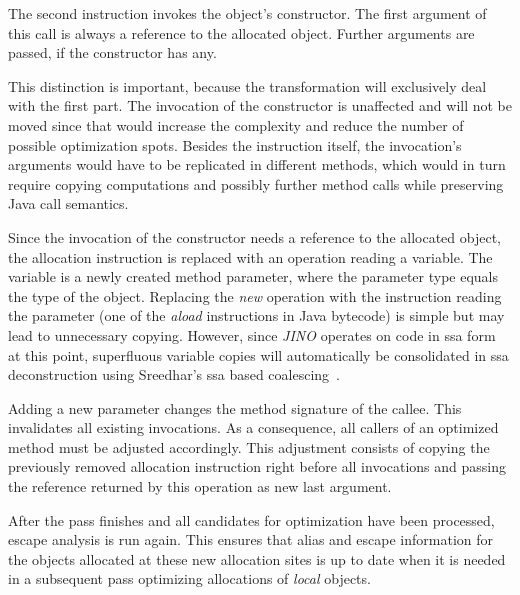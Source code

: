 			The second instruction invokes the object's constructor. The first argument of this call is always a reference to
			the allocated object. Further arguments are passed, if the constructor has any.

			This distinction is important, because the transformation will exclusively deal with the first part. The
			invocation of the constructor is unaffected and will not be moved since that would increase the complexity and
			reduce the number of possible optimization spots. Besides the instruction itself, the invocation's arguments would
			have to be replicated in different methods, which would in turn require copying computations and possibly further
			method calls while preserving Java call semantics.

			Since the invocation of the constructor needs a reference to the allocated object, the allocation instruction is
			replaced with an operation reading a variable. The variable is a newly created method parameter, where the
			parameter type equals the type of the object. Replacing the \emph{new} operation with the instruction reading the
			parameter (one of the \emph{aload} instructions in Java bytecode) is simple but may lead to unnecessary copying.
			However, since \emph{JINO} operates on code in \gls{ssa} form at this point, superfluous variable copies will
			automatically be consolidated in \gls{ssa} deconstruction using Sreedhar's \gls{ssa} based
			coalescing~\cite{sreedhar:99:sas}.

			Adding a new parameter changes the method signature of the callee. This invalidates all existing invocations. As
			a consequence, all callers of an optimized method must be adjusted accordingly. This adjustment consists of
			copying the previously removed allocation instruction right before all invocations and passing the reference
			returned by this operation as new last argument.

			After the pass finishes and all candidates for optimization have been processed, escape analysis is run again.
			This ensures that alias and escape information for the objects allocated at these new allocation sites is up to
			date when it is needed in a subsequent pass optimizing allocations of \emph{local} objects.

